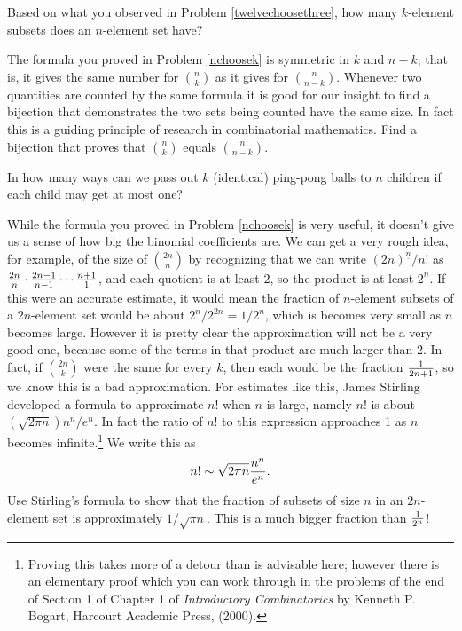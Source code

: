 \iteme  Based on what you observed in Problem
\ref{twelvechoosethree}, how many $k$-element subsets does an
$n$-element set have?\label{nchoosek}

\iteme The formula you proved in Problem \ref{nchoosek} is symmetric in $k$
and $n-k$; that is, it gives the same number for $n\choose k$ as it gives
for $n\choose n-k$.  Whenever two quantities are counted by the same formula
it is good for our insight to find a bijection that demonstrates the two sets
being counted have the same size.  In fact this is a guiding principle of
research in combinatorial mathematics.  Find a bijection that proves that
$n\choose k$ equals $n\choose n-k$.

\iteme In how many ways can we pass out $k$ (identical) ping-pong balls to $n$
children if each child may get at most one?\label{ping-pong}

\itemi While the formula you proved in Problem \ref{nchoosek} is very useful,
it doesn't give us a sense of how big the binomial coefficients are.  We can
get a very rough idea, for example, of the size of $2n\choose n$ by
recognizing that we can write $(2n)^{\underline{n}}/n!$ as ${2n\over n}\cdot
{2n-1\over n-1}\cdots {n+1\over 1}$, and each quotient is at least $2$, so the
product is at least $2^n$.  If this were an accurate estimate, it would mean
the fraction of $n$-element subsets of a $2n$-element set would be
about
$2^n/2^{2n}=1/2^n$, which is becomes very small as $n$ becomes large. 
However it is pretty clear the approximation will not be a very good one,
because some of the terms in that product are much larger than 2.  In fact,
if $2n\choose k$ were the same for every $k$, then each would be the fraction
$1\over 2n+1$, so we know this is a bad approximation.  For estimates like
this, James Stirling developed a formula to approximate
$n!$  when $n$ is large, namely $n!$ is about $ \left(\sqrt{2\pi
n}\right){n^n/ e^n}$.  In fact the ratio of
$n!$ to this expression approaches 1 as
$n$ becomes infinite.\footnote{Proving this takes more of a detour than is
advisable here; however there is an elementary proof which you can work
through in the problems of the end of Section 1 of Chapter 1 of {\em
Introductory Combinatorics} by Kenneth P. Bogart, Harcourt Academic Press,
(2000).}  We write this as $$n!\sim \sqrt{2\pi
n}{n^n\over e^n}.$$  Use Stirling's formula to show that the fraction of 
subsets of size
$n$ in an
$2n$-element set is approximately $1/\sqrt{\pi n}$.  This is a much bigger
fraction than $1\over 2^n$!\label{Stirling'sapproximation}




